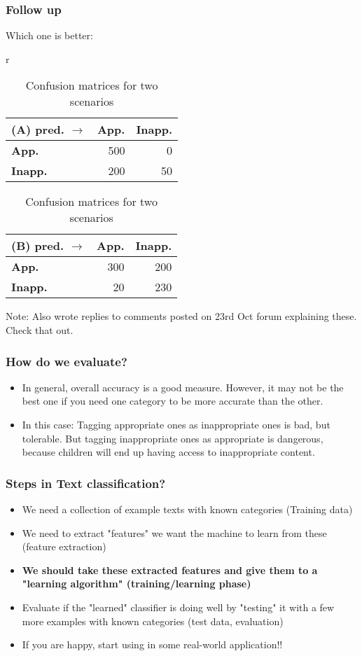 \documentclass{beamer}
\begin{document}
\begin{frame}
\frametitle{Follow up}
Which one is better:
\begin{table}[h]
\begin{center}
\begin{tabular}{r}
  \begin{tabular}{|l|r|r|}
    \hline
    (A) pred. $\rightarrow$&\textbf{App.}&\textbf{Inapp.}\\
    \hline
    \textbf{App.}&500&0\\ \hline
    \textbf{Inapp.}&200&50\\ \hline
    \end{tabular}
  \begin{tabular}{|l|r|r|}
    \hline
    (B) pred. $\rightarrow$&\textbf{App.}&\textbf{Inapp.}\\
    \hline
    \textbf{App.}&300&200\\ \hline
    \textbf{Inapp.}&20&230\\ \hline
    \end{tabular}
\end{tabular}
\caption{Confusion matrices for two scenarios}
\end{center}
\end{table}
Note: Also wrote replies to comments posted on 23rd Oct forum explaining these. Check that out. 
\end{frame}

\begin{frame}
\frametitle{How do we evaluate?}
\begin{itemize}
\item In general, overall accuracy is a good measure. However, it may not be the best one if you need one category to be more accurate than the other. 
\item In this case: Tagging appropriate ones as inappropriate ones is bad, but tolerable. But tagging inappropriate ones as appropriate is dangerous, because children will end up having access to inappropriate content. 
\end{itemize}
\end{frame}

\begin{frame}
\frametitle{Steps in Text classification?}
\begin{itemize}
\item We need a collection of example texts with known categories (Training data)
\item We need to extract "features" we want the machine to learn from these (feature extraction)
\item \textbf{We should take these extracted features and give them to a "learning algorithm" (training/learning phase)}
\item Evaluate if the "learned" classifier is doing well by "testing" it with a few more examples with known categories (test data, evaluation)
\item If you are happy, start using in some real-world application!!
\end{itemize}
\end{frame}
\end{document}

